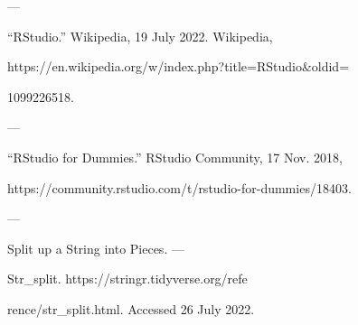 \documentclass{scrartcl}
\begin{document}
---

“RStudio.” Wikipedia, 19 July 2022. Wikipedia, \par
https://en.wikipedia.org/w/index.php?title=RStudio&oldid=\par
1099226518.\par

---

“RStudio for Dummies.” RStudio Community, 17 Nov. 2018, \par
https://community.rstudio.com/t/rstudio-for-dummies/18403.\par 

---

Split up a String into Pieces. — \par 
Str_split. https://stringr.tidyverse.org/refe \par
rence/str_split.html. Accessed 26 July 2022.\par
\end{document}
